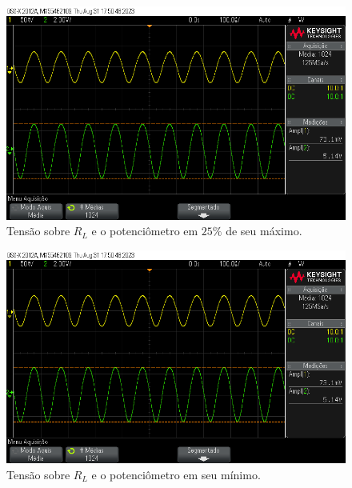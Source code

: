 \begin{figure}[H]
    \centering
    \includegraphics[width=0.5\columnwidth]{images/v_pot1.png}
    \caption{Tensão sobre $R_L$ e o potenciômetro em $25\%$ de seu máximo.}
\end{figure}

\begin{figure}[H]
    \centering
    \includegraphics[width=0.5\columnwidth]{images/v_pot1.png}
    \caption{Tensão sobre $R_L$ e o potenciômetro em seu mínimo.}
\end{figure}
